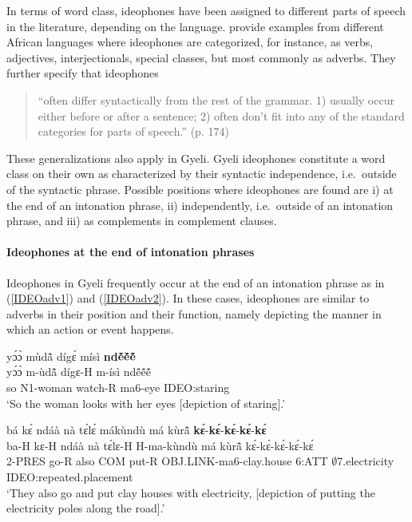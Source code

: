 In terms of word class, ideophones have been assigned to different parts of speech in the literature, depending on the language. \citet[173]{dwyer2003} provide examples from different African languages where ideophones are categorized, for instance, as verbs, adjectives, interjectionals, special classes, but most commonly as adverbs. They further specify that ideophones
\begin{quote}
``often differ syntactically from the rest of the grammar. 1) usually occur either before or after a sentence; 2) often don't fit into any of the standard categories for parts of speech.''
(p. 174)
\end{quote}
These generalizations also apply in Gyeli. Gyeli ideophones constitute a word class on their own as characterized by their syntactic independence, i.e.\ outside of the syntactic phrase. Possible positions where ideophones are found are i) at the end of an intonation phrase, ii) independently, i.e.\ outside of an intonation phrase, and iii) as complements in complement clauses.

\paragraph{Ideophones at the end of intonation phrases}

Ideophones in Gyeli frequently occur at the end of an intonation phrase as in (\ref{IDEOadv1}) and (\ref{IDEOadv2}). In these cases, ideophones are similar to adverbs in their position and their function, namely depicting the manner in which an action or event happens.


\begin{exe} 
\ex\label{IDEOadv1}
  \glll yɔ́ɔ̀ mùdã̂ dígɛ́ mísì {\bfseries ndẽ́ẽ́ẽ́} \\
       yɔ́ɔ̀ m-ùdã̂ dígɛ-H m-ísì ndẽ́ẽ́ẽ́ \\
        so N1-woman watch-R ma6-eye IDEO:staring \\
    \trans `So the woman looks with her eyes [depiction of staring].'
\end{exe}


\begin{exe} 
\ex\label{IDEOadv2} 
  \glll  bá kɛ́ ndáà nà tɛ́lɛ́ mákùndù má kùrã̂  {\bfseries kɛ́}-{\bfseries kɛ́}-{\bfseries kɛ́}-{\bfseries kɛ́}-{\bfseries kɛ́}\\
         ba-H kɛ-H ndáà nà tɛ́lɛ-H H-ma-kùndù má kùrã̂  kɛ́-kɛ́-kɛ́-kɛ́-kɛ́ \\
        2-PRES go-R also COM put-R OBJ.LINK-ma6-clay.house 6:ATT $\emptyset$7.electricity IDEO:repeated.placement \\
    \trans `They also go and put clay houses with electricity, [depiction of putting the electricity poles along the road].'
\end{exe}

